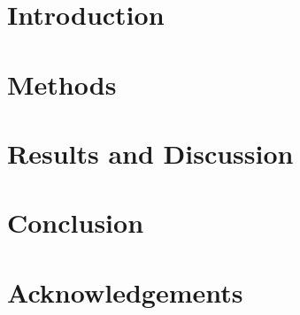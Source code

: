 \documentclass[11pt,
  paper=a4, 
  bibliography=totocnumbered,
	captions=tableheading,
	BCOR=10mm
]{scrreprt}
\theoremstyle{definition}
\begin{document}
\tableofcontents
\listoffigures
\listoftables
\listofalgorithms


\chapter{Introduction}

\chapter{Methods}



\chapter{Results and Discussion}


\chapter{Conclusion}


\chapter*{Acknowledgements}






\glsaddall
\printglossaries

\end{document}
